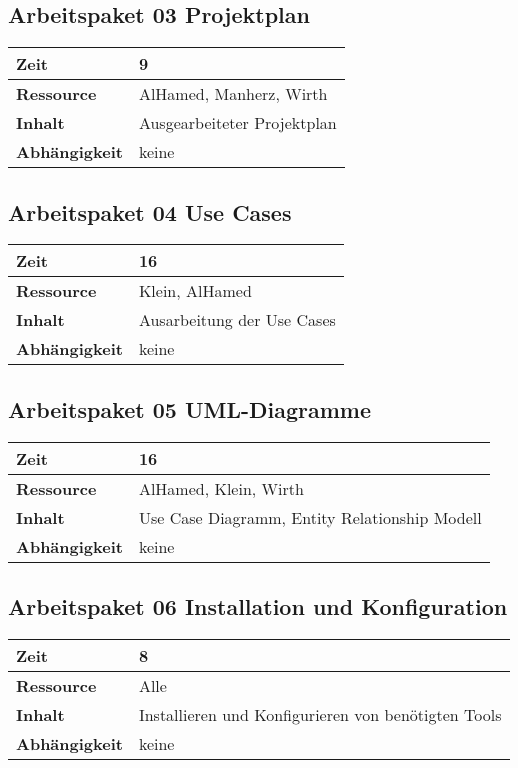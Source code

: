 \documentclass[12pt,a4paper,onecolumn]{article}
\begin{document}
\subsection{Arbeitspaket 03 Projektplan}
\begin{tabularx}{\textwidth}{|l|X|}
\hline
     \textbf{Zeit} &  9\\
     \hline
     \textbf{Ressource} & AlHamed, Manherz, Wirth\\
     \hline
     \textbf{Inhalt} &  Ausgearbeiteter Projektplan\\
     \hline
     \textbf{Abhängigkeit} & keine\\
\hline
\end{tabularx}

\subsection{Arbeitspaket 04 Use Cases}
\begin{tabularx}{\textwidth}{|l|X|}
\hline
     \textbf{Zeit} &  16\\
     \hline
     \textbf{Ressource} & Klein, AlHamed\\
     \hline
     \textbf{Inhalt} &  Ausarbeitung der Use Cases\\
     \hline
     \textbf{Abhängigkeit} & keine\\
\hline
\end{tabularx}

\subsection{Arbeitspaket 05 UML-Diagramme}
\begin{tabularx}{\textwidth}{|l|X|}
\hline
     \textbf{Zeit} &  16\\
     \hline
     \textbf{Ressource} & AlHamed, Klein, Wirth\\
     \hline
     \textbf{Inhalt} &  Use Case Diagramm, Entity Relationship Modell\\
     \hline
     \textbf{Abhängigkeit} & keine \\
\hline
\end{tabularx}

\subsection{Arbeitspaket 06 Installation und Konfiguration}
\begin{tabularx}{\textwidth}{|l|X|}
\hline
     \textbf{Zeit} &  8\\
     \hline
     \textbf{Ressource} & Alle\\
     \hline
     \textbf{Inhalt} &  Installieren und Konfigurieren von benötigten Tools\\
     \hline
     \textbf{Abhängigkeit} & keine\\
\hline
\end{tabularx}
\end{document}
